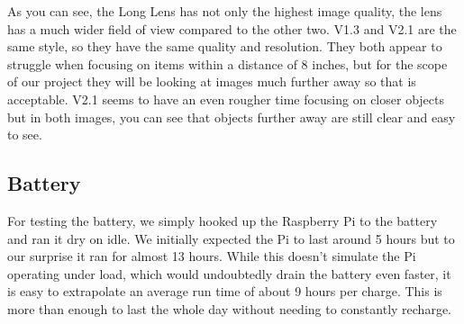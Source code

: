 \documentclass[letterpaper,12pt]{article}
\begin{document}


\medskip

As you can see, the Long Lens has not only the highest image quality, the lens has a much wider field of view compared to the other two. V1.3 and V2.1 are the same style, so they have the same quality and resolution. They both appear to struggle when focusing on items within a distance of 8 inches, but for the scope of our project they will be looking at images much further away so that is acceptable. V2.1 seems to have an even rougher time focusing on closer objects but in both images, you can see that objects further away are still clear and easy to see.\par

\subsection{Battery}


\medskip

For testing the battery, we simply hooked up the Raspberry Pi to the battery and ran it dry on idle. We initially expected the Pi to last around 5 hours but to our surprise it ran for almost 13 hours. While this doesn't simulate the Pi operating under load, which would undoubtedly drain the battery even faster, it is easy to extrapolate an average run time of about 9 hours per charge. This is more than enough to last the whole day without needing to constantly recharge.\par
\end{document}
